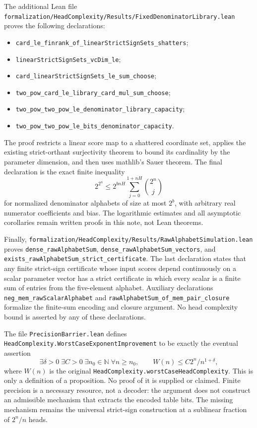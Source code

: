 \documentclass[11pt]{article}
\begin{document}
The additional Lean file
\texttt{formalization/HeadComplexity/Results/FixedDenominatorLibrary.lean}
proves the following declarations:
\begin{itemize}
\item \texttt{card\_le\_finrank\_of\_linearStrictSignSets\_shatters};
\item \texttt{linearStrictSignSets\_vcDim\_le};
\item \texttt{card\_linearStrictSignSets\_le\_sum\_choose};
\item \texttt{two\_pow\_card\_le\_library\_card\_mul\_sum\_choose};
\item \texttt{two\_pow\_two\_pow\_le\_denominator\_library\_capacity};
\item \texttt{two\_pow\_two\_pow\_le\_bits\_denominator\_capacity}.
\end{itemize}
The proof restricts a linear score map to a shattered coordinate set,
applies the existing strict-orthant surjectivity theorem to bound its
cardinality by the parameter dimension, and then uses mathlib's
Sauer theorem. The final declaration is the exact finite inequality
\[
 2^{2^n}\le 2^{bnH}\sum_{j=0}^{1+nH}\binom{2^n}{j}
\]
for normalized denominator alphabets of size at most $2^b$, with
arbitrary real numerator coefficients and bias. The logarithmic
estimates and all asymptotic corollaries remain written proofs in
this note, not Lean theorems.

Finally,
\texttt{formalization/HeadComplexity/Results/RawAlphabetSimulation.lean}
proves \texttt{dense\_rawAlphabetSum},
\texttt{dense\_rawAlphabetSum\_vectors}, and
\texttt{exists\_rawAlphabetSum\_strict\_certificate}.
The last declaration states that any finite strict-sign certificate
whose input scores depend continuously on a scalar parameter vector
has a strict certificate in which every scalar is a finite sum of
entries from the five-element alphabet. Auxiliary declarations
\texttt{neg\_mem\_rawScalarAlphabet} and
\texttt{rawAlphabetSum\_of\_mem\_pair\_closure} formalize the
finite-sum encoding and closure argument. No head complexity bound
is asserted by any of these declarations.

The file \texttt{PrecisionBarrier.lean} defines
\texttt{HeadComplexity.WorstCaseExponentImprovement} to be exactly
the eventual assertion
\[
 \exists\delta>0\;\exists C>0\;\exists n_0\in\mathbb N\;
 \forall n\ge n_0,\qquad
 W(n)\le C2^n/n^{1+\delta},
\]
where $W(n)$ is the original
\texttt{HeadComplexity.worstCaseHeadComplexity}. This is only a
definition of a proposition. No proof of it is supplied or claimed.
Finite precision is a necessary resource, not a decoder: the argument
does not construct an admissible mechanism that extracts the encoded
table bits. The missing mechanism remains the universal strict-sign
construction at a sublinear fraction of $2^n/n$ heads.
\end{document}
